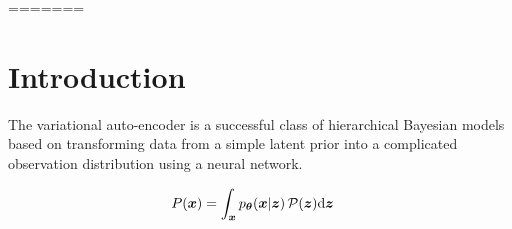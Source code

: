 =======
\section{Introduction}
\label{sec:introduction}

The variational auto-encoder is a successful class of hierarchical Bayesian models based on transforming data from a simple latent prior into a complicated observation distribution using a neural network.

\begin{align*}
    P({\boldsymbol{x}}) &= \int_{\boldsymbol{x}} p_{{\boldsymbol \theta}}({\boldsymbol{x}} | {\boldsymbol z})\, \mathcal{P}({\boldsymbol z}) \mathrm{d}{\boldsymbol z}
\end{align*}



